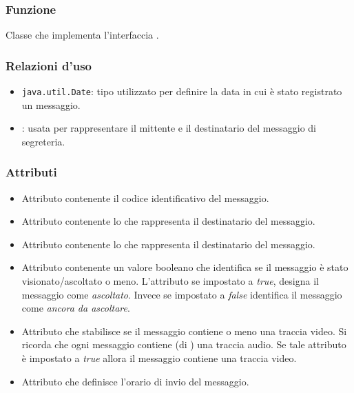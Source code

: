 
\subsubsection*{Funzione}
Classe che implementa l'interfaccia .

\subsubsection*{Relazioni d'uso}
\begin{itemize}
	\item \texttt{java.util.Date}: tipo utilizzato per definire la data in cui è stato registrato un messaggio.
	\item {}: usata per rappresentare il mittente e il destinatario del messaggio di segreteria.
\end{itemize}

\subsubsection*{Attributi}

\begin{itemize}
	\item{}
	Attributo contenente il codice identificativo del messaggio.
	\item{}
	Attributo contenente lo  che rappresenta il destinatario del messaggio.
	\item{}
	Attributo contenente lo  che rappresenta il destinatario del messaggio.
	\item{}
	Attributo contenente un valore booleano che identifica se il messaggio è stato visionato/ascoltato o meno. L'attributo se impostato a \textit{true}, designa il messaggio come \textit{ascoltato}. Invece se impostato a \textit{false} identifica il messaggio come \textit{ancora da ascoltare}.
	\item{}
	Attributo che stabilisce se il messaggio contiene o meno una traccia video. Si ricorda che ogni messaggio contiene (di ) una traccia audio. Se tale attributo è impostato a \textit{true} allora il messaggio contiene una traccia video.
	\item{}
	Attributo che definisce l'orario di invio del messaggio.
\end{itemize}

